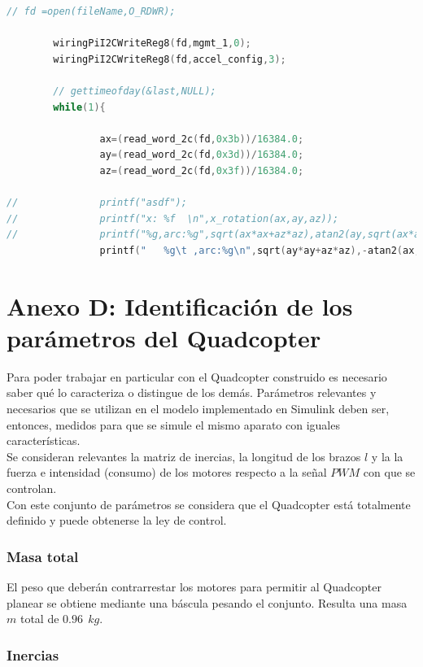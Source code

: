 \documentclass[twoside,11pt]{report}
\begin{document}
\begin{lstlisting}[language=C]
        // fd =open(fileName,O_RDWR);

        wiringPiI2CWriteReg8(fd,mgmt_1,0);
        wiringPiI2CWriteReg8(fd,accel_config,3);

        // gettimeofday(&last,NULL);
        while(1){

                ax=(read_word_2c(fd,0x3b))/16384.0;
                ay=(read_word_2c(fd,0x3d))/16384.0;
                az=(read_word_2c(fd,0x3f))/16384.0;
        
//              printf("asdf");
//              printf("x: %f  \n",x_rotation(ax,ay,az));
//              printf("%g,arc:%g",sqrt(ax*ax+az*az),atan2(ay,sqrt(ax*ax+az*az))*180/PI);
                printf("   %g\t ,arc:%g\n",sqrt(ay*ay+az*az),-atan2(ax,sqrt(ay*ay+az*az))*180/PI);

\end{lstlisting}

\newpage
\section*{Anexo D: Identificación de los parámetros del Quadcopter}
Para poder trabajar en particular con el Quadcopter construido es necesario saber qué lo caracteriza o distingue de los demás. Parámetros relevantes y necesarios que se utilizan en el modelo implementado en Simulink deben ser, entonces, medidos para que se simule el mismo aparato con iguales características. \\

Se consideran relevantes la matriz de inercias, la longitud de los brazos  $l$ y la la fuerza e intensidad (consumo) de los motores respecto a la señal $PWM$ con que se controlan.\\

Con este conjunto de parámetros se considera que el Quadcopter está totalmente definido y puede obtenerse la ley de control.

\subsubsection*{Masa total}

El peso que deberán contrarrestar los motores para permitir al Quadcopter planear se obtiene mediante una báscula pesando el conjunto. Resulta una masa $m$ total de $0.96 \>\> kg$.  

\subsubsection*{Inercias}
\end{document}
